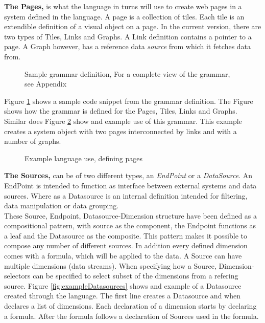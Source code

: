 \textbf{The Pages,} is what the language in turns will use to create web pages in a system
defined in the language.
A page is a collection of tiles. 
Each tile is an extendible definition of a visual object on a page.
In the current version, there are two types of Tiles, Links and Graphs.
A Link definition contains a pointer to a page. 
A Graph however, has a reference data \textit{source} from which it fetches data from.
\begin{figure}
\begin{center}

\end{center}
\caption{Sample grammar definition, For a complete view of the grammar, see Appendix }
\label{fig:grammadefinition}
\end{figure}
Figure \ref{fig:grammadefinition} shows a sample code snippet from the grammar definition.
The Figure shows how the grammar is defined for the Pages, Tiles, Links and Graphs.
Similar does Figure \ref{fig:examplePages} show and example use of this grammar. 
This example creates a system object with two pages interconnected by links and with a number
of graphs.
\begin{figure}
\begin{center}

\end{center}
\caption{Example language use, defining pages}
\label{fig:examplePages}
\end{figure}

\textbf{The Sources, } can be of two different types, an \textit{EndPoint} or a \textit{DataSource}.
An EndPoint is intended to function as interface between external systems and data sources. 
Where as a Datasource is an internal definition intended for filtering, data manipulation or
data grouping.\\
These Source, Endpoint, Datasource-Dimension structure have been defined as a compositional
pattern, with source as the component, the Endpoint functions as a leaf and
the Datasource as the composite.
This pattern makes it possible to compose any number of different sources.
In addition every defined dimension comes with a formula, which will be applied to the data.
A Source can have multiple dimensions (data streams). When specifying how a Source,
Dimension-selectors can be specified to select subset of the dimensions from a refering source.
Figure \ref{fig:exampleDatasources} shows and example of a Datasource created through the
language. 
The first line creates a Datasource and when declares a list of dimensions. 
Each declaration of a dimension starts by declaring a formula. After the formula follows a
declaration of Sources used in the formula. 

